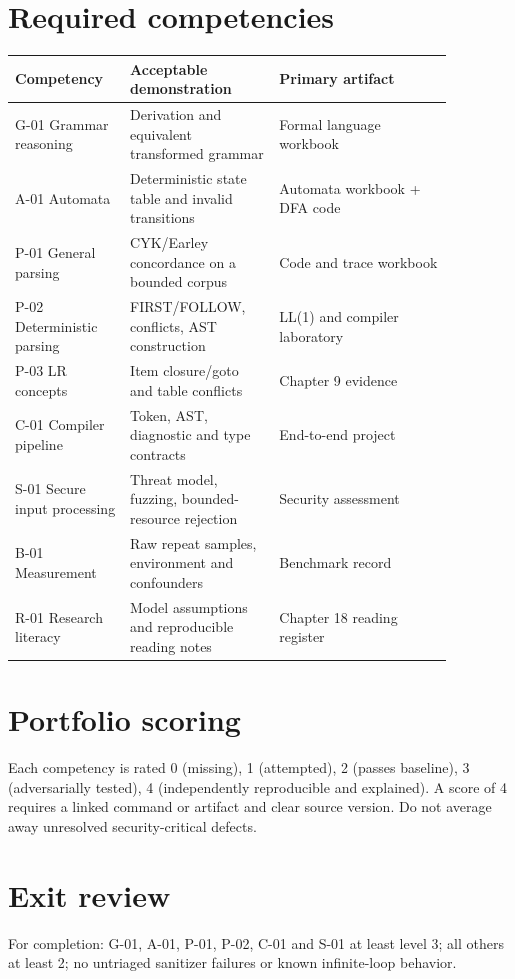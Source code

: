 \documentclass[11pt,letterpaper]{article}
\begin{document}
\makedoctitle\makedocsummary
\tableofcontents\clearpage
\section{Required competencies}
\small\begin{longtable}{p{0.22\linewidth}p{0.30\linewidth}p{0.35\linewidth}}\toprule Competency & Acceptable demonstration & Primary artifact\\\midrule\endhead
G-01 Grammar reasoning & Derivation and equivalent transformed grammar & Formal language workbook\\
A-01 Automata & Deterministic state table and invalid transitions & Automata workbook + DFA code\\
P-01 General parsing & CYK/Earley concordance on a bounded corpus & Code and trace workbook\\
P-02 Deterministic parsing & FIRST/FOLLOW, conflicts, AST construction & LL(1) and compiler laboratory\\
P-03 LR concepts & Item closure/goto and table conflicts & Chapter 9 evidence\\
C-01 Compiler pipeline & Token, AST, diagnostic and type contracts & End-to-end project\\
S-01 Secure input processing & Threat model, fuzzing, bounded-resource rejection & Security assessment\\
B-01 Measurement & Raw repeat samples, environment and confounders & Benchmark record\\
R-01 Research literacy & Model assumptions and reproducible reading notes & Chapter 18 reading register\\
\bottomrule\end{longtable}\normalsize
\section{Portfolio scoring}
Each competency is rated 0 (missing), 1 (attempted), 2 (passes baseline), 3 (adversarially tested), 4 (independently reproducible and explained). A score of 4 requires a linked command or artifact and clear source version. Do not average away unresolved security-critical defects.\section{Exit review}
For completion: G-01, A-01, P-01, P-02, C-01 and S-01 at least level 3; all others at least 2; no untriaged sanitizer failures or known infinite-loop behavior.
\end{document}
